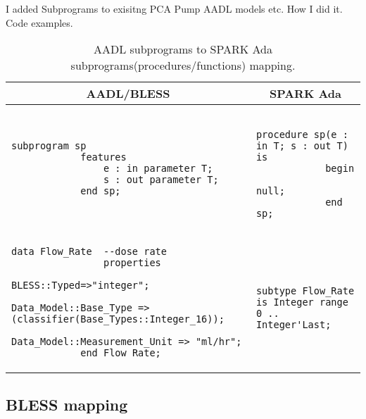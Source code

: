 I added Subprograms to exisitng PCA Pump AADL models etc.
How I did it. Code examples.

\begin{table}[!ht]
	\caption{AADL subprograms to SPARK Ada subprograms(procedures/functions) mapping.}
	\label{table:subprograms_mapping}
	\centering
  	\begin{tabular}{ | p{3in} | p{3in} |}

		\hline
		\multicolumn{1}{|c|}{\textbf{AADL/BLESS}} & \multicolumn{1}{|c|}{\textbf{SPARK Ada}} \\ \hline

		\begin{lstlisting}[language=aadl]
			subprogram sp
			features
				e : in parameter T;
				s : out parameter T;
			end sp;
		\end{lstlisting} 
		& 
		\begin{lstlisting}
			procedure sp(e : in T; s : out T) is 
			begin
				null;
			end sp;
		\end{lstlisting} 

		\\ \hline

		\begin{lstlisting}[language=aadl]
			data Flow_Rate  --dose rate
  				properties
    				BLESS::Typed=>"integer";
    				Data_Model::Base_Type => (classifier(Base_Types::Integer_16));
    				Data_Model::Measurement_Unit => "ml/hr";
			end Flow_Rate;
		\end{lstlisting} 
		& 
		\begin{lstlisting}
			subtype Flow_Rate is Integer range 0 .. Integer'Last;
		\end{lstlisting} 

		\\ \hline
	\end{tabular}
\end{table}



\subsection{BLESS mapping}
\label{codegen:mapping:bless}

